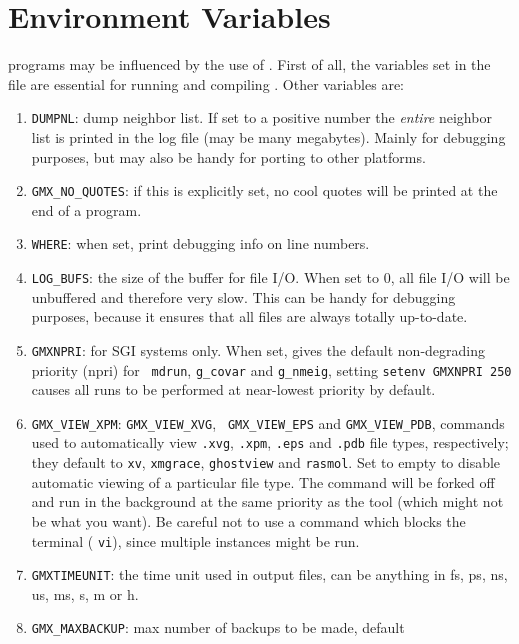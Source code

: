 \section{Environment Variables}
{\gromacs} programs may be influenced by the use of 
. 
First of all, the variables set in the  file
are essential for running and compiling {\gromacs}. Other variables are:
\begin{enumerate}
\item   {\tt DUMPNL}: dump neighbor list. 
        If set to a positive number the {\em entire}
        neighbor list is printed in the log file (may be many megabytes).
        Mainly for debugging purposes, but may also be handy for
        porting to other platforms.
\item   {\tt GMX_NO_QUOTES}: if this is explicitly set, no cool quotes
        will be printed at the end of a program.
\item   {\tt WHERE}: when set, print debugging info on line numbers.
\item   {\tt LOG_BUFS}: the size of the buffer for file I/O. When set
        to 0, all file I/O will be unbuffered and therefore very slow.
        This can be handy for debugging purposes, because it ensures
        that all files are always totally up-to-date.
\item   {\tt GMXNPRI}: for SGI systems only. When set, gives the
        default non-degrading priority (npri) for {\tt
        mdrun}, {\tt g_covar} and {\tt g_nmeig},
        {\eg}\@ setting \verb'setenv GMXNPRI 250' causes all
        runs to be performed at near-lowest priority by default.
\item   {\tt GMX_VIEW_XPM}: {\tt GMX_VIEW_XVG}, {\tt
        GMX_VIEW_EPS} and {\tt GMX_VIEW_PDB}, commands used to
        automatically view \@ {\tt .xvg}, {\tt .xpm}, {\tt .eps}
        and {\tt .pdb} file types, respectively; they default to {\tt xv}, {\tt xmgrace},
        {\tt ghostview} and {\tt rasmol}. Set to empty to disable
        automatic viewing of a particular file type. The command will
        be forked off and run in the background at the same priority
        as the {\gromacs} tool (which might not be what you want).
        Be careful not to use a command which blocks the terminal
        ({\eg} {\tt vi}), since multiple instances might be run.
\item   {\tt GMXTIMEUNIT}: the time unit used in output files, can be
        anything in fs, ps, ns, us, ms, s, m or h.
\item {\tt GMX_MAXBACKUP}: max number of backups to be made, default

\end{enumerate}
